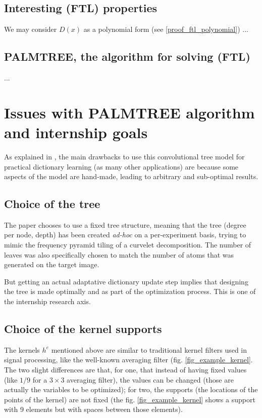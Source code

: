 \subsection{Interesting (FTL) properties}
We may consider $D(x)$ as a polynomial form (see \ref{proof_ftl_polynomial}) ...

\subsection{PALMTREE, the algorithm for solving (FTL)}
...

\section{Issues with PALMTREE algorithm and internship goals}
As explained in \cite[p. 23]{chabiron_optimization_2016}, the main drawbacks to use this convolutional tree model for practical dictionary learning (as many other applications) are because some aspects of the model are hand-made, leading to arbitrary and sub-optimal results.
\subsection{Choice of the tree}
The paper chooses to use a fixed tree structure, meaning that the tree (degree per node, depth) has been created \emph{ad-hoc} on a per-experiment basis, trying to mimic the frequency pyramid tiling of a curvelet decomposition. The number of leaves was also specifically chosen to match the number of atoms that was generated on the target image.

But getting an actual adaptative dictionary update step implies that designing the tree is made optimally and as part of the optimization process. This is one of the internship research axis.

\subsection{Choice of the kernel supports}
The kernels $h^e$ mentioned above are similar to traditional kernel filters used in signal processing, like the well-known averaging filter (fig. \ref{fig_example_kernel}. The two slight differences are that, for one, that instead of having fixed values (like $1/9$ for a $3\times3$ averaging filter), the values can be changed (those are actually the variables to be optimized); for two, the supports (the locations of the points of the kernel) are not fixed (the fig. \ref{fig_example_kernel} shows a support with 9 elements but with spaces between those elements).


